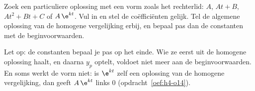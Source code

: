 \begin{werkwijze}
Zoek een particuliere oplossing met een vorm zoals het rechterlid: $A$, $At + B$, $At^2 + Bt + C$ of $A\,\e^{kt}$. Vul in en stel de coëfficiënten gelijk. Tel de algemene oplossing van de homogene vergelijking erbij, en bepaal pas dan de constanten met de beginvoorwaarden.
\end{werkwijze}

Let op: de constanten bepaal je pas op het einde. Wie ze eerst uit de homogene oplossing haalt, en daarna $y_p$ optelt, voldoet niet meer aan de beginvoorwaarden. En soms werkt de vorm niet: is $\e^{kt}$ zelf een oplossing van de homogene vergelijking, dan geeft $A\,\e^{kt}$ links 0 (opdracht~\ref{oef:h4-o14}).


\begin{oefeningen}
\end{oefeningen}

\opdrachtenkop

\begin{oefeningen}




















\end{oefeningen}


